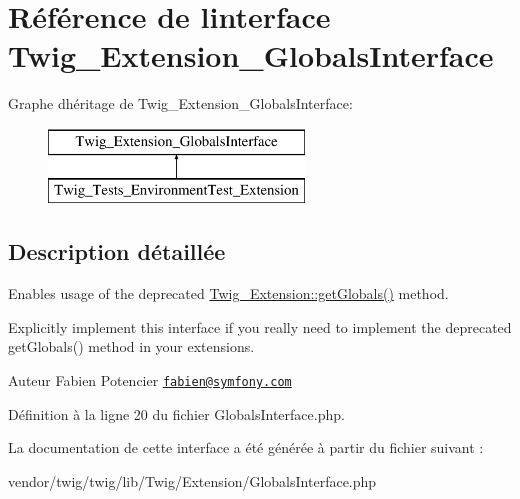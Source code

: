 \hypertarget{interface_twig___extension___globals_interface}{}\section{Référence de l\textquotesingle{}interface Twig\+\_\+\+Extension\+\_\+\+Globals\+Interface}
\label{interface_twig___extension___globals_interface}
Graphe d\textquotesingle{}héritage de Twig\+\_\+\+Extension\+\_\+\+Globals\+Interface\+:\begin{figure}[H]
\begin{center}
\leavevmode
\includegraphics[height=2.000000cm]{interface_twig___extension___globals_interface}
\end{center}
\end{figure}


\subsection{Description détaillée}
Enables usage of the deprecated \hyperlink{class_twig___extension_ae3a26252ce6efe503698085a7ed69dad}{Twig\+\_\+\+Extension\+::get\+Globals()} method.

Explicitly implement this interface if you really need to implement the deprecated get\+Globals() method in your extensions.

\begin{DoxyAuthor}{Auteur}
Fabien Potencier \href{mailto:fabien@symfony.com}{\tt fabien@symfony.\+com} 
\end{DoxyAuthor}


Définition à la ligne 20 du fichier Globals\+Interface.\+php.



La documentation de cette interface a été générée à partir du fichier suivant \+:\begin{DoxyCompactItemize}
\item 
vendor/twig/twig/lib/\+Twig/\+Extension/Globals\+Interface.\+php\end{DoxyCompactItemize}
